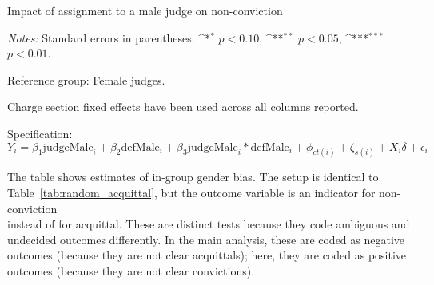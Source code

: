 \documentclass[12pt,english]{article}
\def\sym#1{\ifmmode^{#1}\else\(^{#1}\)\fi}
\newcommand{\HOME}{\string~}
\newcommand{\curpath}{\HOME/ddl/justice-overleaf}
\newcommand{\curpath}{.}
\begin{document}
\begin{appendices}
\begin{landscape}
\begin{table}
    \begin{center}
        \caption{Impact of assignment to a male judge on non-conviction}
        \label{tab:app_random_female}
        
    \end{center}
    \begin{minipage}{1.5\textwidth}
        \footnotesize 
        \emph{Notes:} Standard errors in parentheses. \sym{*} \(p<0.10\), \sym{**} \(p<0.05\), \sym{***} \(p<0.01\).  \par 
        Reference group: Female judges.  \par
        Charge section fixed effects have been used across all columns reported. \par
        Specification: $Y_{i} = \beta_{1} \text{judgeMale}_{i} + \beta_{2} \text{defMale}_{i} + \beta_{3} \text{judgeMale}_{i} * \text{defMale}_{i} + \phi_{ct(i)} + \zeta_{s(i)} + X_i \delta + \epsilon_{i}$ \par
        The table shows estimates of in-group gender bias. The setup is identical to Table~\ref{tab:random_acquittal}, but the outcome variable is an indicator for non-conviction \\ instead of for acquittal. These are distinct tests because they code ambiguous and undecided outcomes differently. In the main analysis, these are coded as negative outcomes (because they are not clear acquittals); here, they are coded as positive outcomes (because they are not clear convictions).
   \end{minipage}
\end{table}

\clearpage


\end{landscape}
\end{appendices}
\end{document}
